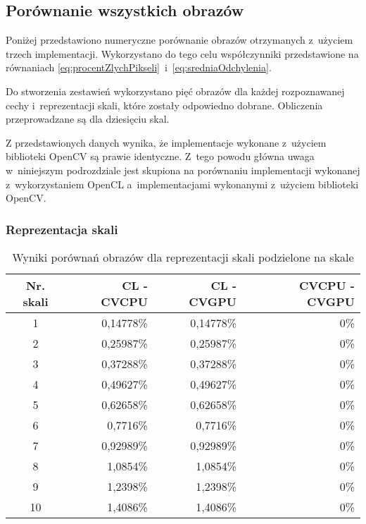 \subsection{Porównanie wszystkich obrazów}
\label{subsec:porownanieNumerycznePoprawnosc}

Poniżej przedstawiono numeryczne porównanie obrazów otrzymanych z~użyciem trzech implementacji. Wykorzystano do tego celu współczynniki przedstawione na równaniach \eqref{eq:procentZlychPikseli}~i~\eqref{eq:sredniaOdchylenia}.

Do stworzenia zestawień wykorzystano pięć obrazów dla każdej rozpoznawanej cechy i~reprezentacji skali, które zostały odpowiedno dobrane. Obliczenia przeprowadzane są dla dziesięciu skal.

Z przedstawionych danych wynika, że implementacje wykonane z~użyciem biblioteki OpenCV są prawie identyczne. Z~tego powodu główna uwaga w~niniejszym podrozdziale jest skupiona na porównaniu implementacji wykonanej z~wykorzystaniem OpenCL a~implementacjami wykonanymi z~użyciem biblioteki OpenCV.
\subsubsection{Reprezentacja skali}
\label{subsubsec:reprezentacjaSakliTabele}

\begin{center}
\begin{table}
\centering
\caption{Wyniki porównań obrazów dla reprezentacji skali podzielone na skale}
\label{tab:imageScaleRep}
\begin{tabular}{|c|r|r|r|}
 \hline
Nr. skali & CL - CVCPU & CL - CVGPU & CVCPU - CVGPU \\ \hline
1 & 0,14778\% & 0,14778\% & 0\% \\ \hline
2 & 0,25987\% & 0,25987\% & 0\% \\ \hline
3 & 0,37288\% & 0,37288\% & 0\% \\ \hline
4 & 0,49627\% & 0,49627\% & 0\% \\ \hline
5 & 0,62658\% & 0,62658\% & 0\% \\ \hline
6 & 0,7716\% & 0,7716\% & 0\% \\ \hline
7 & 0,92989\% & 0,92989\% & 0\% \\ \hline
8 & 1,0854\% & 1,0854\% & 0\% \\ \hline
9 & 1,2398\% & 1,2398\% & 0\% \\ \hline
10 & 1,4086\% & 1,4086\% & 0\% \\ \hline
\end{tabular}
\end{table}
\end{center}

